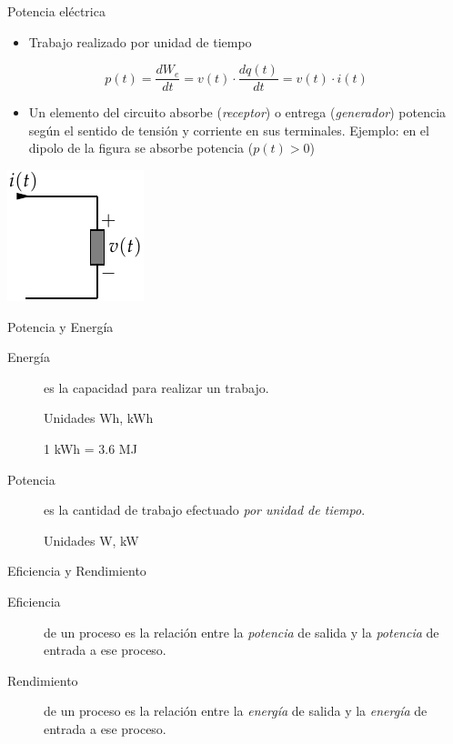 \documentclass[xcolor={usenames,svgnames,dvipsnames}]{beamer}
\begin{document}
\begin{frame}[label={sec:org577f4b7}]{Potencia eléctrica}
\begin{itemize}
\item Trabajo realizado por unidad de tiempo
\end{itemize}
\[
p(t)=\frac{dW_{e}}{dt}=v(t)\cdot\frac{dq(t)}{dt}=v(t)\cdot i(t)
\]

\begin{itemize}
\item Un elemento del circuito absorbe (\emph{receptor}) o entrega
(\emph{generador}) potencia según el sentido de tensión y corriente en
sus terminales. Ejemplo: en el dipolo de la figura se absorbe
potencia (\(p(t)>0\))
\end{itemize}
\begin{center}
\includegraphics[height=0.5\textheight]{../figs/ReceptorPasivo.pdf}
\end{center}
\end{frame}

\begin{frame}[label={sec:orga6d284f}]{Potencia y Energía}
\begin{description}
\item[{Energía}] es la capacidad para realizar un trabajo.

Unidades Wh, kWh

1 kWh = 3.6 MJ

\item[{Potencia}] es la cantidad de trabajo efectuado \emph{por unidad de
tiempo}.

Unidades W, kW
\end{description}
\end{frame}

\begin{frame}[label={sec:org3c819f9}]{Eficiencia y Rendimiento}
\begin{description}
\item[{Eficiencia}] de un proceso es la relación entre la \emph{potencia} de
salida y la \emph{potencia} de entrada a ese proceso.

\item[{Rendimiento}] de un proceso es la relación entre la \emph{energía} de
salida y la \emph{energía} de entrada a ese proceso.
\end{description}
\end{frame}
\end{document}
